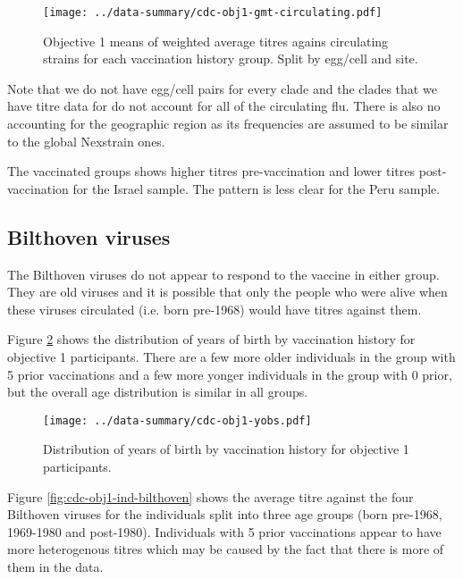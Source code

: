 \documentclass[12pt]{article}
\begin{document}
\begin{figure}
	\texttt{[image: ../data-summary/cdc-obj1-gmt-circulating.pdf]}
	\caption{Objective 1 means of weighted average titres agains circulating strains for each vaccination history group. Split by egg/cell and site.}
	\label{fig:cdc-obj1-gmt-circulating}
\end{figure}

Note that we do not have egg/cell pairs for every clade and the clades that we have titre data for do not account for all of the circulating flu. There is also no accounting for the geographic region as its frequencies are assumed to be similar to the global Nexstrain ones.

The vaccinated groups shows higher titres pre-vaccination and lower titres post-vaccination for the Israel sample. The pattern is less clear for the Peru sample.

\subsection{Bilthoven viruses}

The Bilthoven viruses do not appear to respond to the vaccine in either group.
They are old viruses and it is possible that only the people who were alive when
these viruses circulated (i.e. born pre-1968) would have titres against them.

Figure \ref{fig:cdc-obj1-yobs} shows the distribution of years of birth by vaccination history for objective 1 participants. There are a few more older individuals in the  group with 5 prior vaccinations and a few more yonger individuals in the  group with 0 prior, but the overall age distribution is similar in all groups.

\begin{figure}
	\texttt{[image: ../data-summary/cdc-obj1-yobs.pdf]}
	\caption{Distribution of years of birth by vaccination history for objective 1 participants.}
	\label{fig:cdc-obj1-yobs}
\end{figure}

Figure \ref{fig:cdc-obj1-ind-bilthoven} shows the average titre against the four Bilthoven viruses for
the individuals split into three age groups (born pre-1968, 1969-1980 and post-1980). Individuals with 5 prior vaccinations appear to have more heterogenous titres which may be caused by the fact that there is more of them in the data.
\end{document}
